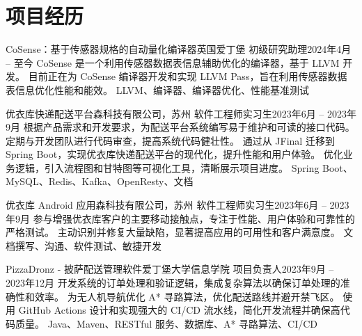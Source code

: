 \section{项目经历}
  \resumeSubHeadingListStart
    \resumeSubheading
      {CoSense：基于传感器规格的自动量化编译器}{英国爱丁堡}
      {初级研究助理}{2024年4月 -- 至今}
      \resumeItemListStart
          {CoSense 是一个利用传感器数据表信息辅助优化的编译器，基于 LLVM 开发。}
          {目前正在为 CoSense 编译器开发和实现 LLVM Pass，旨在利用传感器数据表信息优化性能和能效。}
          {LLVM、编译器、编译器优化、性能基准测试}
      \resumeItemListEnd

    \resumeSubheading
      {优衣库快递配送平台}{森科技有限公司，苏州}
      {软件工程师实习生}{2023年6月 -- 2023年9月}
      \resumeItemListStart
          {根据产品需求和开发要求，为配送平台系统编写易于维护和可读的接口代码。}
          {定期与开发团队进行代码审查，提高系统代码健壮性。}
          {通过从 JFinal 迁移到 Spring Boot，实现优衣库快递配送平台的现代化，提升性能和用户体验。}
          {优化业务逻辑，引入流程图和甘特图等可视化工具，清晰展示项目进度。}
          {Spring Boot、MySQL、Redis、Kafka、OpenResty、文档}
      \resumeItemListEnd

    \resumeSubheading
      {优衣库 Android 应用}{森科技有限公司，苏州}
      {软件工程师实习生}{2023年6月 -- 2023年9月}
      \resumeItemListStart
          {参与增强优衣库客户的主要移动接触点，专注于性能、用户体验和可靠性的严格测试。}
          {主动识别并修复大量缺陷，显著提高应用的可用性和客户满意度。}
          {文档撰写、沟通、软件测试、敏捷开发}
      \resumeItemListEnd

    \resumeSubheading
      {PizzaDronz - 披萨配送管理软件}{爱丁堡大学信息学院}
      {项目负责人}{2023年9月 -- 2023年12月}
      \resumeItemListStart
          {开发系统的订单处理和验证逻辑，集成复杂算法以确保订单处理的准确性和效率。}
          {为无人机导航优化 A* 寻路算法，优化配送路线并避开禁飞区。}
          {使用 GitHub Actions 设计和实现强大的 CI/CD 流水线，简化开发流程并确保高代码质量。}
          {Java、Maven、RESTful 服务、数据库、A* 寻路算法、CI/CD}
      \resumeItemListEnd

  \resumeSubHeadingListEnd